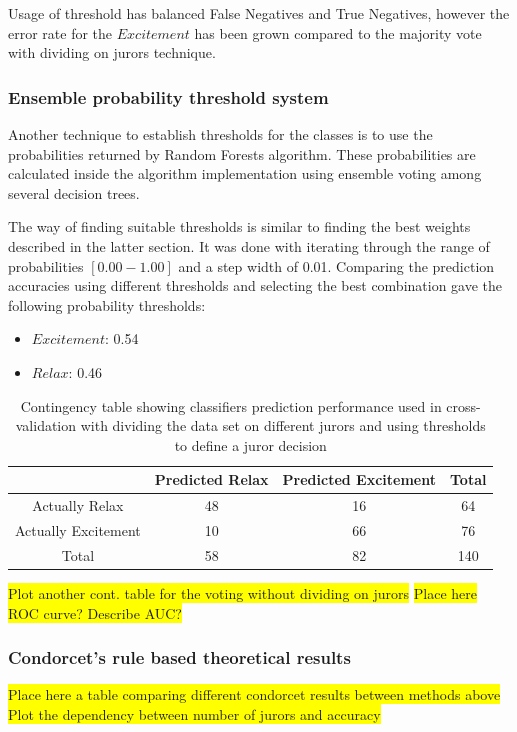 \documentclass[12pt]{article}
\begin{document}
Usage of threshold has balanced False Negatives and True Negatives, however the error rate for the $Excitement$ has been grown compared to the majority vote with dividing on jurors technique.

\subsubsection{Ensemble probability threshold system}

Another technique to establish thresholds for the classes is to use the probabilities returned by Random Forests algorithm. These probabilities are calculated inside the algorithm implementation using ensemble voting among several decision trees. 

The way of finding suitable thresholds is similar to finding the best weights described in the latter section. It was done with iterating through the range of probabilities $[0.00-1.00]$ and a step width of 0.01. Comparing the prediction accuracies using different thresholds and selecting the best combination gave the following probability thresholds:
\begin{itemize}
\item $Excitement$: 0.54
\item $Relax$: 0.46
\end{itemize}


\begin{table}[H]
\caption{Contingency table showing classifiers prediction performance used in cross-validation with dividing the data set on different jurors and using thresholds to define a juror decision} \label{tab:title} 
\begin{center}
  \begin{tabular}{ | c | c | c | c | }
    \hline
     & Predicted Relax & Predicted Excitement & Total \\ \hline
    Actually Relax & 48 & 16 & 64 \\ \hline
    Actually Excitement & 10 & 66 & 76 \\ \hline
    Total & 58 & 82 & 140 \\ 
    \hline
  \end{tabular}
\end{center}
\end{table}

\colorbox{yellow}{Plot another cont. table for the voting without dividing on jurors}
\colorbox{yellow}{Place here ROC curve? Describe AUC?}

\subsubsection{Condorcet's rule based theoretical results}
\colorbox{yellow}{Place here a table comparing different condorcet results between methods above}
\colorbox{yellow}{Plot the dependency between number of jurors and accuracy}
\end{document}
